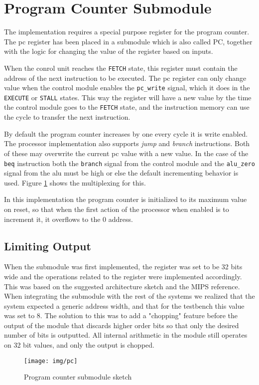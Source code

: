 \section{Program Counter Submodule}
The implementation requires a special purpose register for the program counter.
The \gls{pc} register has been placed in a submodule which is also called PC,
together with the logic for changing the value of the register based on inputs.

When the conrol unit reaches the \texttt{FETCH} state,
this register must contain the address of the next instruction to be executed.
The \gls{pc} register can only change value when the control module enables the \texttt{pc\_write} signal,
which it does in the \texttt{EXECUTE} or \texttt{STALL} states.
This way the register will have a new value by the time the control module goes to the \texttt{FETCH} state,
and the instruction memory can use the cycle to transfer the next instruction.

By default the program counter increases by one every cycle it is write enabled.
The processor implementation also supports \textit{jump} and \textit{branch} instructions.
Both of these may overwrite the current \gls{pc} value with a new value.
In the case of the \texttt{beq} instruction both the \texttt{branch} signal from the control module and the \texttt{alu\_zero} signal from the \gls{alu} must be high or else the default incrementing behavior is used.
Figure \ref{fig:pc} shows the multiplexing for this.

In this implementation the program counter is initialized to its maximum value on reset,
so that when the first action of the processor when enabled is to increment it,
it overflows to the 0 address.

\subsection{Limiting Output}
When the submodule was first implemented,
the register was set to be 32 bits wide and the operations related to the register were implemented accordingly.
This was based on the suggested architecture sketch and the MIPS reference\cite[Appendix D]{bib:compendium}.
When integrating the submodule with the rest of the systems we realized that the system expected a generic address width,
and that for the testbench this value was set to 8.
The solution to this was to add a "chopping" feature before the output of the module that discards higher order bits so that only the desired number of bits is outputted.
All internal arithmetic in the module still operates on 32 bit values,
and only the output is chopped.

\begin{figure}[p]
    \centering
    \texttt{[image: img/pc]}
    \caption{Program counter submodule sketch}
    \label{fig:pc}
\end{figure}

